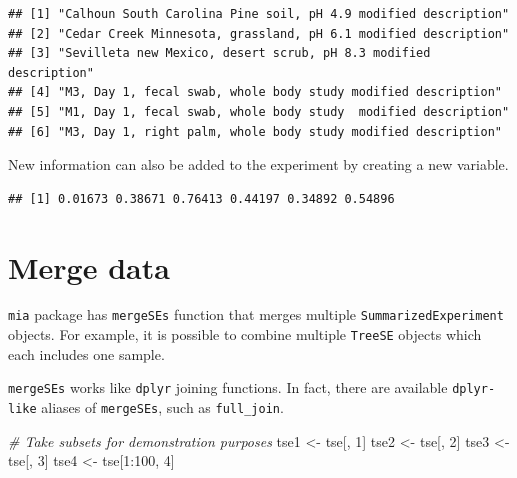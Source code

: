\documentclass[
]{book}
\newenvironment{Shaded}{\begin{snugshade}}{\end{snugshade}}
\newcommand{\CommentTok}[1]{\textcolor[rgb]{0.56,0.35,0.01}{\textit{#1}}}
\newcommand{\DecValTok}[1]{\textcolor[rgb]{0.00,0.00,0.81}{#1}}
\newcommand{\FunctionTok}[1]{\textcolor[rgb]{0.00,0.00,0.00}{#1}}
\newcommand{\NormalTok}[1]{#1}
\newcommand{\OtherTok}[1]{\textcolor[rgb]{0.56,0.35,0.01}{#1}}
\newcommand{\SpecialCharTok}[1]{\textcolor[rgb]{0.00,0.00,0.00}{#1}}
\begin{document}
\begin{verbatim}
## [1] "Calhoun South Carolina Pine soil, pH 4.9 modified description"  
## [2] "Cedar Creek Minnesota, grassland, pH 6.1 modified description"  
## [3] "Sevilleta new Mexico, desert scrub, pH 8.3 modified description"
## [4] "M3, Day 1, fecal swab, whole body study modified description"   
## [5] "M1, Day 1, fecal swab, whole body study  modified description"  
## [6] "M3, Day 1, right palm, whole body study modified description"
\end{verbatim}

New information can also be added to the experiment by creating a new variable.

\begin{Shaded}
\end{Shaded}

\begin{verbatim}
## [1] 0.01673 0.38671 0.76413 0.44197 0.34892 0.54896
\end{verbatim}

\hypertarget{merge-data}{%
\section{Merge data}\label{merge-data}}

\texttt{mia} package has \texttt{mergeSEs} function that merges multiple \texttt{SummarizedExperiment}
objects. For example, it is possible to combine multiple \texttt{TreeSE} objects which each
includes one sample.

\texttt{mergeSEs} works like \texttt{dplyr} joining functions. In fact, there are available
\texttt{dplyr-like} aliases of \texttt{mergeSEs}, such as \texttt{full\_join}.

\begin{Shaded}
\begin{Highlighting}[]
\CommentTok{\# Take subsets for demonstration purposes}
\NormalTok{tse1 }\OtherTok{\textless{}{-}}\NormalTok{ tse[, }\DecValTok{1}\NormalTok{]}
\NormalTok{tse2 }\OtherTok{\textless{}{-}}\NormalTok{ tse[, }\DecValTok{2}\NormalTok{]}
\NormalTok{tse3 }\OtherTok{\textless{}{-}}\NormalTok{ tse[, }\DecValTok{3}\NormalTok{]}
\NormalTok{tse4 }\OtherTok{\textless{}{-}}\NormalTok{ tse[}\DecValTok{1}\SpecialCharTok{:}\DecValTok{100}\NormalTok{, }\DecValTok{4}\NormalTok{]}
\end{Highlighting}
\end{Shaded}
\end{document}
